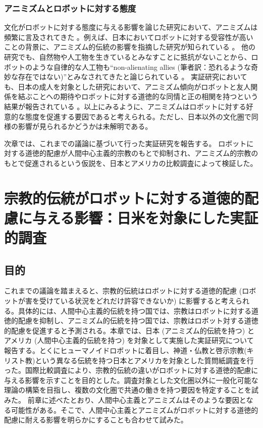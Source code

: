 \documentclass[a4j,12pt]{jreport}
\begin{document}
\subsection{アニミズムとロボットに対する態度}
文化がロボットに対する態度に与える影響を論じた研究において、アニミズムは頻繁に言及されてきた\cite{mania, allison, social, gygi} 。例えば、日本においてロボットに対する受容性が高いことの背景に、アニミズム的伝統の影響を指摘した研究が知られている\cite{mania} 。
他の研究でも、自然物や人工物を生きているとみなすことに抵抗がないことから、ロボットのような自律的な人工物も“non-alienating allies (筆者訳：恐れるような奇妙な存在ではない)”とみなされてきたと論じられている\cite{gygi} 。
実証研究においても、日本の成人を対象とした研究において、アニミズム傾向がロボットと友人関係を結ぶことへの期待やロボットに対する道徳的な同情と正の相関を持つという結果が報告されている\cite{okanda} 。以上にみるように、アニミズムはロボットに対する好意的な態度を促進する要因であると考えられる。ただし、日本以外の文化圏で同様の影響が見られるかどうかは未解明である。


次章では、これまでの議論に基づいて行った実証研究を報告する。
ロボットに対する道徳的配慮が人間中心主義的宗教のもとで抑制され、アニミズム的宗教のもとで促進されるという仮説を、日本とアメリカの比較調査によって検証した。



\newpage
\chapter{宗教的伝統がロボットに対する道徳的配慮に与える影響：日米を対象にした実証的調査}

\section{目的}
これまでの議論を踏まえると、宗教的伝統はロボットに対する道徳的配慮 (ロボットが害を受けている状況をどれだけ許容できないか) に影響すると考えられる。具体的には、人間中心主義的伝統を持つ国では、宗教はロボットに対する道徳的配慮を抑制し、アニミズム的伝統を持つ国では、宗教はロボット対する道徳的配慮を促進すると予測される。本章では、日本 (アニミズム的伝統を持つ) とアメリカ (人間中心主義的伝統を持つ) を対象として実施した実証研究について報告する。とくにヒューマノイドロボットに着目し、神道・仏教と啓示宗教(キリスト教)という異なる伝統を持つ日本とアメリカを対象とした質問紙調査を行った。国際比較調査により、宗教的伝統の違いがロボットに対する道徳的配慮に与える影響を示すことを目的とした。調査対象とした文化圏以外に一般化可能な理論の構築を目指し、複数の文化圏で共通の働きを持つ要因を特定することを試みた。
前章に述べたとおり、人間中心主義とアニミズムはそのような要因となる可能性がある。そこで、人間中心主義とアニミズムがロボットに対する道徳的配慮に耐える影響を明らかにすることも合わせて試みた。
\end{document}
